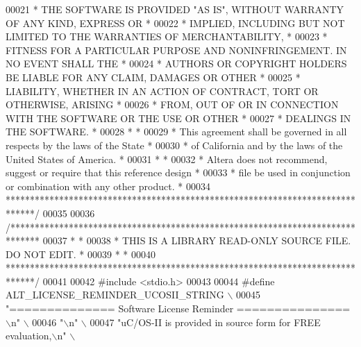 \begin{DoxyCode}
00021 \textcolor{comment}{* THE SOFTWARE IS PROVIDED "AS IS", WITHOUT WARRANTY OF ANY KIND, EXPRESS OR  *}
00022 \textcolor{comment}{* IMPLIED, INCLUDING BUT NOT LIMITED TO THE WARRANTIES OF MERCHANTABILITY,    *}
00023 \textcolor{comment}{* FITNESS FOR A PARTICULAR PURPOSE AND NONINFRINGEMENT. IN NO EVENT SHALL THE *}
00024 \textcolor{comment}{* AUTHORS OR COPYRIGHT HOLDERS BE LIABLE FOR ANY CLAIM, DAMAGES OR OTHER      *}
00025 \textcolor{comment}{* LIABILITY, WHETHER IN AN ACTION OF CONTRACT, TORT OR OTHERWISE, ARISING     *}
00026 \textcolor{comment}{* FROM, OUT OF OR IN CONNECTION WITH THE SOFTWARE OR THE USE OR OTHER         *}
00027 \textcolor{comment}{* DEALINGS IN THE SOFTWARE.                                                   *}
00028 \textcolor{comment}{*                                                                             *}
00029 \textcolor{comment}{* This agreement shall be governed in all respects by the laws of the State   *}
00030 \textcolor{comment}{* of California and by the laws of the United States of America.              *}
00031 \textcolor{comment}{*                                                                             *}
00032 \textcolor{comment}{* Altera does not recommend, suggest or require that this reference design    *}
00033 \textcolor{comment}{* file be used in conjunction or combination with any other product.          *}
00034 \textcolor{comment}{******************************************************************************/}
00035 
00036 \textcolor{comment}{/******************************************************************************}
00037 \textcolor{comment}{*                                                                             *}
00038 \textcolor{comment}{* THIS IS A LIBRARY READ-ONLY SOURCE FILE. DO NOT EDIT.                       *}
00039 \textcolor{comment}{*                                                                             *}
00040 \textcolor{comment}{******************************************************************************/}
00041 
00042 \textcolor{preprocessor}{#include <stdio.h>}
00043 
00044 \textcolor{preprocessor}{#define ALT\_LICENSE\_REMINDER\_UCOSII\_STRING                                     \(\backslash\)}
00045 \textcolor{preprocessor}{    "============== Software License Reminder ===============\(\backslash\)n"               \(\backslash\)}
00046 \textcolor{preprocessor}{    "\(\backslash\)n"                                                                       \(\backslash\)}
00047 \textcolor{preprocessor}{    "uC/OS-II is provided in source form for FREE evaluation,\(\backslash\)n"               \(\backslash\)}

\end{DoxyCode}
